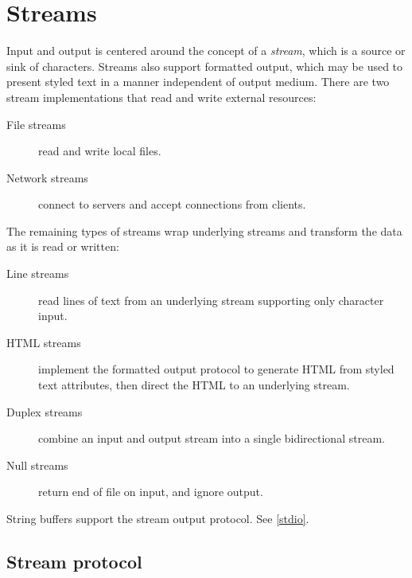 \documentclass{book}
\begin{document}
\chapter{Streams}

Input and output is centered around the concept of a \emph{stream}, which is a source or
sink of characters. Streams also support formatted output, which may be used to present styled text in a manner independent of output medium. There are two stream implementations that read and write external resources:

\begin{description}
\item[File streams] read and write local files.
\item[Network streams] connect to servers and accept connections from clients.
\end{description}

The remaining types of streams wrap underlying streams and transform the data as it is read or written:

\begin{description}
\item[Line streams] read lines of text from an underlying stream supporting only character input.
\item[HTML streams] implement the formatted output protocol to generate HTML from styled text attributes, then direct the HTML to an underlying stream.
\item[Duplex streams] combine an input and output stream into a single bidirectional stream.
\item[Null streams] return end of file on input, and ignore output.
\end{description}

String buffers support the stream output protocol. See \ref{stdio}.

\section{Stream protocol}\label{stream-protocol}
\end{document}
